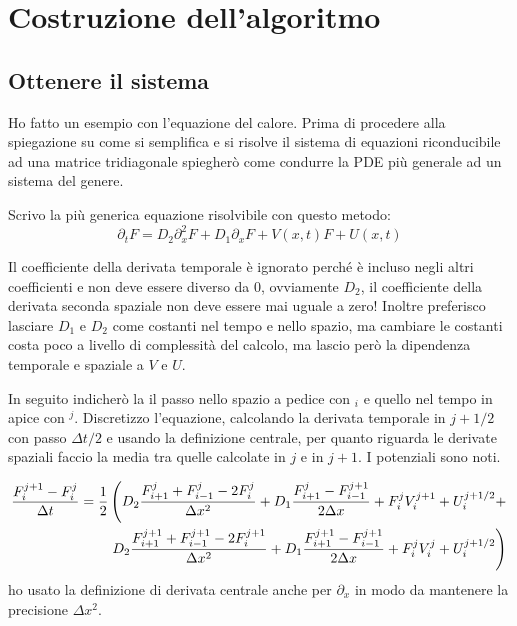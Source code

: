 \section{Costruzione dell'algoritmo}
\subsection{Ottenere il sistema}
Ho fatto un esempio con l'equazione del calore. Prima di procedere alla spiegazione su come si semplifica e si risolve il sistema di equazioni riconducibile ad una matrice tridiagonale spiegher\`o come condurre la PDE pi\`u generale ad un sistema del genere.

Scrivo la pi\`u generica equazione risolvibile con questo metodo:
\begin{equation}\label{eq:generica}
  \partial_t F = D_2 \partial^2_x F + D_1 \partial_x F + V(x,t) F + U(x,t)
\end{equation}

Il coefficiente della derivata temporale \`e ignorato perch\'e \`e incluso negli altri coefficienti e non deve essere diverso da 0, ovviamente $D_2$, il coefficiente della derivata seconda spaziale non deve essere mai uguale a zero!
Inoltre preferisco lasciare $D_1$ e $D_2$ come costanti nel tempo e nello spazio, ma cambiare le costanti costa poco a livello di complessit\`a del calcolo, ma lascio per\`o la dipendenza temporale e spaziale a $V$ e $U$.

In seguito indicher\`o la il passo nello spazio a pedice con $_i$ e quello nel tempo in apice con $^j$.
Discretizzo l'equazione, calcolando la derivata temporale in $j+1/2$ con passo $\Delta t/2$ e usando la definizione centrale, per quanto riguarda le derivate spaziali faccio la media tra quelle calcolate in $j$ e in $j+1$. I potenziali sono noti.

\begin{equation}
  \begin{aligned}
    \frac{F_i^{j+1} - F_i^j}{\Delta t} = \frac 12&\lr(.{D_2\frac{F^j_{i+1}+F^{j}_{i-1}-2F_i^{j}}{\Delta x^2} + D_1\frac{F^j_{i+1}-F^{j+1}_{i-1}}{2\Delta x} + F_i^j V_i^{j+1} + U_i^{j+1/2}+}\\
    &\lr.){D_2\frac{F^{j+1}_{i+1}+F^{j+1}_{i-1}-2F_i^{j+1}}{\Delta x^2} + D_1\frac{F^{j+1}_{i+1}-F^{j+1}_{i-1}}{2\Delta x} + F_i^{j} V_i^{j} + U_i^{j+1/2}}
  \end{aligned}
\end{equation}
ho usato la definizione di derivata centrale anche per $\partial_x$ in modo da mantenere la precisione $\Delta x^2$.

